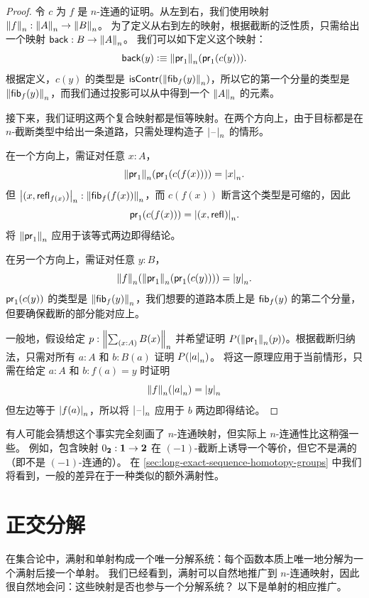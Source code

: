 \begin{proof}
令 $c$ 为 $f$ 是 $n$-连通的证明。从左到右，我们使用映射 $\trunc{n}{f} : \trunc{n}{A} \to \trunc{n}{B}$。
为了定义从右到左的映射，根据截断的泛性质，只需给出一个映射 $\mathsf{back} : B \to {\trunc{n}{A}}$。
我们可以如下定义这个映射：
\[
\mathsf{back}(y) \defeq \trunc{n}{\proj{1}}{(\proj{1}{(c(y))})}.
\]
根据定义，$c(y)$ 的类型是 $\iscontr(\trunc n {\hfiber{f}y})$，所以它的第一个分量的类型是 $\trunc n{\hfiber{f}y}$，而我们通过投影可以从中得到一个 $\trunc n A$ 的元素。

接下来，我们证明这两个复合映射都是恒等映射。在两个方向上，由于目标都是在 $n$-截断类型中给出一条道路，只需处理构造子 $\tprojf{n}$ 的情形。

在一个方向上，需证对任意 $x:A$，
\[
\trunc{n}{\proj{1}}{(\proj{1}{(c(f(x)))})} = \tproj{n}{x}.
\]
但 $\tproj{n}{(x, \refl{f(x)})} : \trunc n{\hfiber{f}{f(x)}}$，而 $c(f(x))$ 断言这个类型是可缩的，因此
\[
\proj{1}{(c(f(x)))} = \tproj{n}{(x, \refl{})}.
\]
将 $\trunc{n}{\proj{1}}$ 应用于该等式两边即得结论。

在另一个方向上，需证对任意 $y:B$，
\[
\trunc{n}{f}(\trunc{n}{\proj{1}} (\proj{1}{(c(y))})) = \tproj{n}{y}.
\]
$\proj{1}{(c(y))}$ 的类型是 $\trunc n {\hfiber{f}y}$，我们想要的道路本质上是 $\hfiber{f}y$ 的第二个分量，但要确保截断的部分能对应上。

一般地，假设给定 $p:\trunc{n}{\sm{x:A} B(x)}$ 并希望证明
$P(\trunc{n}{\proj{1}{}}(p))$。根据截断归纳法，只需对所有 $a:A$ 和 $b:B(a)$ 证明 $P(\tproj{n}{a})$。
将这一原理应用于当前情形，只需在给定 $a:A$ 和 $b:f (a) = y$ 时证明
\[
\trunc{n}{f}(\tproj{n}{a}) = \tproj{n}{y}
\]
但左边等于 $\tproj{n}{f (a)}$，所以将 $\tprojf{n}$ 应用于 $b$ 两边即得结论。
\end{proof}

有人可能会猜想这个事实完全刻画了 $n$-连通映射，但实际上 $n$-连通性比这稍强一些。
例如，包含映射 $\bfalse:\unit \to\bool$ 在 $(-1)$-截断上诱导一个等价，但它不是满的（即不是 $(-1)$-连通的）。
在 \cref{sec:long-exact-sequence-homotopy-groups} 中我们将看到，一般的差异在于一种类似的额外满射性。

\section{正交分解}
\label{sec:image-factorization}

%
%
在集合论中，满射和单射构成一个唯一分解系统：每个函数本质上唯一地分解为一个满射后接一个单射。
我们已经看到，满射可以自然地推广到 $n$-连通映射，因此很自然地会问：这些映射是否也参与一个分解系统？
以下是单射的相应推广。


